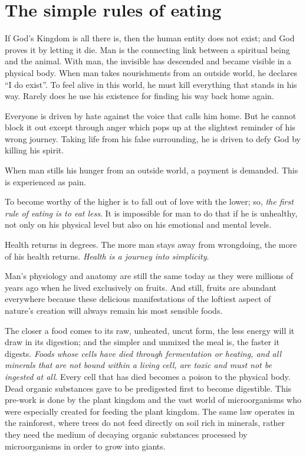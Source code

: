 \documentclass[landscape,twocolumn,letterpaper]{article}
\begin{document}
\section{The simple rules of eating}

If God's Kingdom is all there is, then the human entity does not
exist; and God proves it by letting it die. Man is the connecting link
between a spiritual being and the animal. With man, the invisible has
descended and became visible in a physical body. When man takes
nourishments from an outside world, he declares ``I do exist''. To
feel alive in this world, he must kill everything that stands in his
way. Rarely does he use his existence for finding his way back home
again.

Everyone is driven by hate against the voice that calls him home. But
he cannot block it out except through anger which pops up at the
slightest reminder of his wrong journey. Taking life from his false
surrounding, he is driven to defy God by killing his spirit.

When man stills his hunger from an outside world, a payment is
demanded. This is experienced as pain.

To become worthy of the higher is to fall out of love with the lower;
so, \emph{the first rule of eating is to eat less}. It is impossible
for man to do that if he is unhealthy, not only on his physical level
but also on his emotional and mental levels.

Health returns in degrees. The more man stays away from wrongdoing,
the more of his health returns. \emph{Health is a journey into
simplicity}.

Man's physiology and anatomy are still the same today as they were
millions of years ago when he lived exclusively on fruits. And still,
fruits are abundant everywhere because these delicious manifestations
of the loftiest aspect of nature's creation will always remain his
most sensible foods.

The closer a food comes to its raw, unheated, uncut form, the less
energy will it draw in its digestion; and the simpler and unmixed the
meal is, the faster it digests. \emph{Foods whose cells have died
through fermentation or heating, and all minerals that are not bound
within a living cell, are toxic and must not be ingested at
all}. Every cell that has died becomes a poison to the physical
body. Dead organic substances gave to be predigested first to become
digestible. This pre-work is done by the plant kingdom and the vast
world of microorganisms who were especially created for feeding the
plant kingdom. The same law operates in the rainforest, where trees do
not feed directly on soil rich in minerals, rather they need the
medium of decaying organic substances processed by microorganisms in
order to grow into giants.
\end{document}
